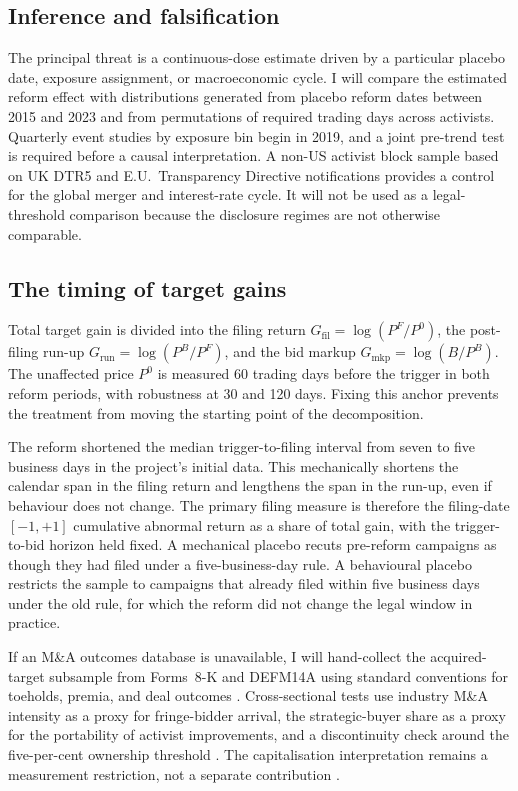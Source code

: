 \subsection{Inference and falsification}
\label{sec:inference}

The principal threat is a continuous-dose estimate driven by a particular
placebo date, exposure assignment, or macroeconomic cycle. I will compare the
estimated reform effect with distributions generated from placebo reform dates
between 2015 and 2023 and from permutations of required trading days across
activists. Quarterly event studies by exposure bin begin in 2019, and a joint
pre-trend test is required before a causal interpretation. A non-US activist
block sample based on UK DTR5 and E.U.\ Transparency Directive notifications
provides a control for the global merger and interest-rate cycle. It will not be
used as a legal-threshold comparison because the disclosure regimes are not
otherwise comparable.

\subsection{The timing of target gains}
\label{sec:gain-anatomy}

Total target gain is divided into the filing return
$G_{\mathrm{fil}}=\log(P^F/P^0)$, the post-filing run-up
$G_{\mathrm{run}}=\log(P^B/P^F)$, and the bid markup
$G_{\mathrm{mkp}}=\log(B/P^B)$. The unaffected price $P^0$ is measured
60 trading days before the trigger in both reform periods, with robustness at
30 and 120 days. Fixing this anchor prevents the treatment from moving the
starting point of the decomposition.

The reform shortened the median trigger-to-filing interval from seven to five
business days in the project's initial data. This mechanically shortens the
calendar span in the filing return and lengthens the span in the run-up, even if
behaviour does not change. The primary filing measure is therefore the
filing-date $[-1,+1]$ cumulative abnormal return as a share of total gain, with
the trigger-to-bid horizon held fixed. A mechanical placebo recuts pre-reform
campaigns as though they had filed under a five-business-day rule. A behavioural
placebo restricts the sample to campaigns that already filed within five
business days under the old rule, for which the reform did not change the legal
window in practice.

If an M\&A outcomes database is unavailable, I will hand-collect the
acquired-target subsample from Forms~8-K and DEFM14A using standard conventions
for toeholds, premia, and deal outcomes
\parencite{bett2014,eckbomalenkothorburn2025}. Cross-sectional tests use industry
M\&A intensity as a proxy for fringe-bidder arrival, the strategic-buyer share
as a proxy for the portability of activist improvements, and a discontinuity
check around the five-per-cent ownership threshold
\parencite{corumlevit2019,burkartlee2022,brav2008}. The capitalisation
interpretation remains a measurement restriction, not a separate contribution
\parencite{celentanolevine2025}.

